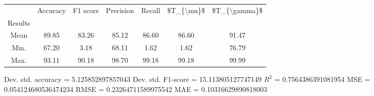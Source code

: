 \begin{tabular}{|c|c|c|c|c|c|c|}
\toprule
{} &  Accuracy &  F1 score &  Precision &  Recall &  \$T\_\{\textbackslash mu\}\$ &  \$T\_\{\textbackslash gamma\}\$ \\
Results &           &           &            &         &            &               \\
\hline
Mean    &     89.85 &     83.26 &      85.12 &   86.60 &      86.60 &         91.47 \\
Min.    &     67.20 &      3.18 &      68.11 &    1.62 &       1.62 &         76.79 \\
Max.    &     93.11 &     90.18 &      98.70 &   99.18 &      99.18 &         99.99 \\
\bottomrule
\end{tabular}

 Dev. std. accuracy = 5.125852897857043
 Dev. std. F1-score = 15.113805127747149
 $R^2$ = 0.7564386391081954
 MSE = 0.054124680536474234
 RMSE = 0.23264711589975542
 MAE = 0.10316629890818003